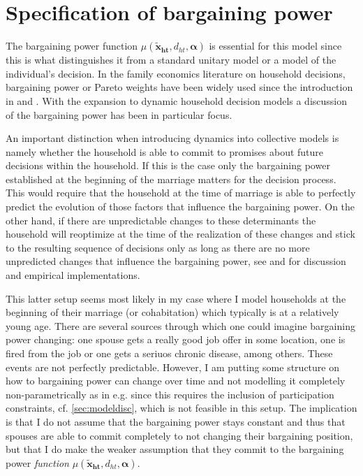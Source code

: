 
\section{Specification of bargaining power}
The bargaining power function $\mu(\boldsymbol{\tilde{x}_{ht}},d_{ht},\boldsymbol{\alpha})$ is essential for this model since this is what distinguishes it from a standard unitary model or a model of the individual's decision. In the family economics literature on household decisions, bargaining power or Pareto weights have been widely used since the introduction in \cite{ManserBrown1980} and \cite{McElroyetal1981}. With the expansion to dynamic household decision models a discussion of the bargaining power has been in particular focus. 

An important distinction when introducing dynamics into collective models is namely whether the household is able to commit to promises about future decisions within the household. If this is the case only the bargaining power established at the beginning of the marriage matters for the decision process. This would require that the household at the time of marriage is able to perfectly predict the evolution of those factors that influence the bargaining power. On the other hand, if there are unpredictable changes to these determinants the household will reoptimize at the time of the realization of these changes and stick to the resulting sequence of decisions only as long as there are no more unpredicted changes that influence the bargaining power, see \cite{LundbergPollak2003,Ligon2011,Theloudis2016} and \cite{Mazzocco2007} for discussion and empirical implementations. 

This latter setup seems most likely in my case where I model households at the beginning of their marriage (or cohabitation) which typically is at a relatively young age. There are several sources through which one could imagine bargaining power changing: one spouse gets a really good job offer in some location, one is fired from the job or one gets a seriuos chronic disease, among others. These events are not perfectly predictable. However, I am putting some structure on how to bargaining power can change over time and not modelling it completely non-parametrically as in e.g. \cite{Voena2015} since this requires the inclusion of participation constraints, cf. \autoref{sec:modeldisc}, which is not feasible in this setup. The implication is that I do not assume that the bargaining power stays constant and thus that spouses are able to commit completely to not changing their bargaining position, but that I do make the weaker assumption that they commit to the bargaining power \textit{function} $\mu(\boldsymbol{\tilde{x}_{ht}},d_{ht},\boldsymbol{\alpha})$. 

